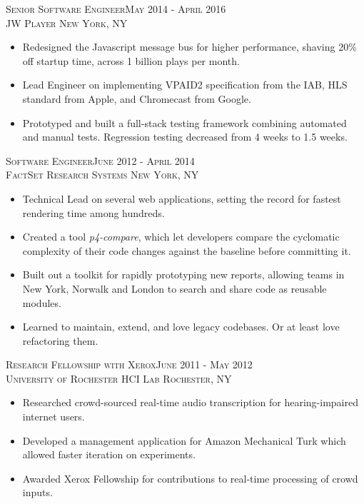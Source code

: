 \textsc{Senior Software Engineer\hfill May 2014 - April 2016\\}
\textsc{JW Player \hfill New York, NY\\}
\begin{itemize}
	\setlength{\itemsep}{1pt}
	\setlength{\itemsep}{1pt}
	\setlength{\parskip}{0pt}
	\setlength{\parsep}{0pt}
	\setlength{\leftmargin}{-5mm}
        \item Redesigned the Javascript message bus for higher performance, shaving 20\% off startup time, across 1 billion plays per month.
        \item Lead Engineer on implementing VPAID2 specification from the IAB, HLS standard from Apple, and Chromecast from Google.
        \item Prototyped and built a full-stack testing framework combining automated and manual tests. Regression testing decreased from 4 weeks to 1.5 weeks.
\end{itemize}


\textsc{Software Engineer\hfill June 2012 - April 2014\\}
\textsc{FactSet Research Systems \hfill New York, NY\\}
\begin{itemize}
        \setlength{\itemsep}{1pt}
	\setlength{\parskip}{0pt}
	\setlength{\parsep}{0pt}
	\item Technical Lead on several web applications, setting the record for fastest rendering time among hundreds.
	\item Created a tool \textit{p4-compare}, which let developers compare the cyclomatic complexity of their code
	changes against the baseline before committing it.
	\item Built out a toolkit for rapidly prototyping new reports, allowing teams in New York, Norwalk and London to search and share code as reusable modules.
	\item Learned to maintain, extend, and love legacy codebases. Or at least love refactoring them.
\end{itemize}



\clearpage


\textsc{Research Fellowship with Xerox\hfill June 2011 - May 2012\\}
\textsc{University of Rochester HCI Lab \hfill Rochester, NY\\}
\begin{itemize}
  \setlength{\itemsep}{1pt}
  \setlength{\parskip}{0pt}
  \setlength{\parsep}{0pt}
  \setlength{\leftmargin}{-5mm}
      \item Researched crowd-sourced real-time audio transcription for hearing-impaired internet users.
      \item Developed a management application for Amazon Mechanical Turk which allowed faster iteration on experiments.
      \item Awarded Xerox Fellowship for contributions to real-time processing of crowd inputs.
\end{itemize}

